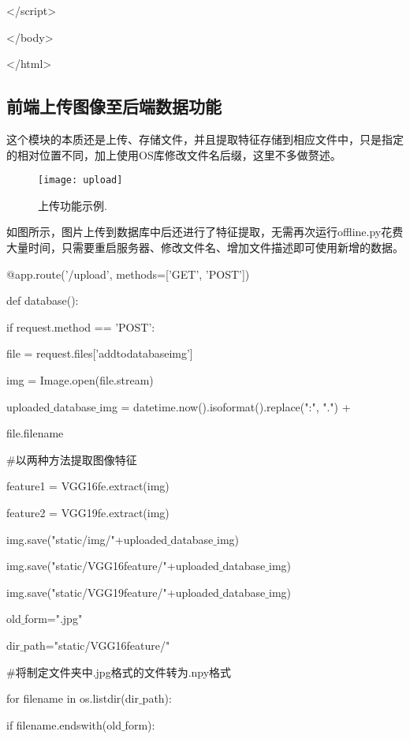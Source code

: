 \documentclass[bachelor_p]{hdu-thesis}
\begin{document}
</script>

</body>

</html>

\subsection {前端上传图像至后端数据功能}

这个模块的本质还是上传、存储文件，并且提取特征存储到相应文件中，只是指定的相对位置不同，加上使用OS库修改文件名后缀，这里不多做赘述。

\begin{figure}[!htb]
  \centering
  \texttt{[image: upload]}
  \caption{上传功能示例.}
  \label{fig_upload}
\end{figure}

如图所示，图片上传到数据库中后还进行了特征提取，无需再次运行offline.py花费大量时间，只需要重启服务器、修改文件名、增加文件描述即可使用新增的数据。

@app.route('/upload', methods=['GET', 'POST'])

def database():

\qquad if request.method == 'POST':

\qquad \qquad file = request.files['addtodatabaseimg']

\qquad \qquad img = Image.open(file.stream)

\qquad \qquad uploaded$\_$database$\_$img = datetime.now().isoformat().replace(":", ".") + 

\qquad \qquad file.filename
        
$\#$以两种方法提取图像特征

\qquad \qquad feature1 = VGG16fe.extract(img)

\qquad \qquad feature2 = VGG19fe.extract(img)
        
\qquad \qquad img.save("static/img/"+uploaded$\_$database$\_$img)

\qquad \qquad img.save("static/VGG16feature/"+uploaded$\_$database$\_$img)

\qquad \qquad img.save("static/VGG19feature/"+uploaded$\_$database$\_$img)
        
\qquad \qquad old$\_$form=".jpg"
        
\qquad \qquad dir$\_$path="static/VGG16feature/"

$\#$将制定文件夹中.jpg格式的文件转为.npy格式

\qquad \qquad for filename in os.listdir(dir$\_$path):

\qquad \qquad \qquad if filename.endswith(old$\_$form):
\end{document}
